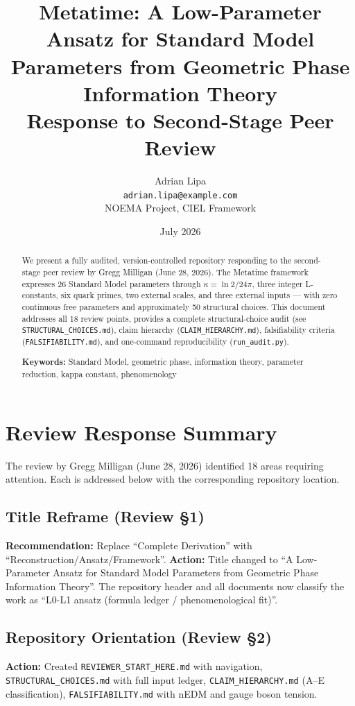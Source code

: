 \documentclass[12pt,a4paper]{article}
\title{Metatime: A Low-Parameter Ansatz for Standard Model\\Parameters from Geometric Phase Information Theory\\
\large Response to Second-Stage Peer Review}
\author{Adrian Lipa\\[3mm]
\small \texttt{adrian.lipa@example.com}\\[2mm]
\small NOEMA Project, CIEL Framework}
\date{July 2026}
\begin{document}
\maketitle

\begin{abstract}
We present a fully audited, version-controlled repository responding to the second-stage
peer review by Gregg Milligan (June 28, 2026). The Metatime framework expresses 26 Standard
Model parameters through $\kappa = \ln 2 / 24\pi$, three integer L-constants, six quark primes,
two external scales, and three external inputs --- with zero continuous free parameters and
approximately 50 structural choices. This document addresses all 18 review points, provides
a complete structural-choice audit (see \texttt{STRUCTURAL\_CHOICES.md}), claim hierarchy
(\texttt{CLAIM\_HIERARCHY.md}), falsifiability criteria (\texttt{FALSIFIABILITY.md}), and
one-command reproducibility (\texttt{run\_audit.py}).

\textbf{Keywords:} Standard Model, geometric phase, information theory, parameter reduction,
kappa constant, phenomenology
\end{abstract}

\section{Review Response Summary}

The review by Gregg Milligan (June 28, 2026) identified 18 areas requiring attention.
Each is addressed below with the corresponding repository location.

\subsection{Title Reframe (Review \S1)}
\textbf{Recommendation:} Replace ``Complete Derivation'' with ``Reconstruction/Ansatz/Framework''.
\textbf{Action:} Title changed to ``A Low-Parameter Ansatz for Standard Model Parameters from
Geometric Phase Information Theory''. The repository header and all documents now
classify the work as ``L0-L1 ansatz (formula ledger / phenomenological fit)''.

\subsection{Repository Orientation (Review \S2)}
\textbf{Action:} Created \texttt{REVIEWER\_START\_HER\allowbreak E.md} with navigation,
\texttt{STRUCTURAL\_CHOICES.md} with full input ledger, \texttt{CLAIM\_HIERARCHY.md} (A--E
classification), \texttt{FALSIFIABILITY.md} with nEDM and gauge boson tension.
\end{document}
